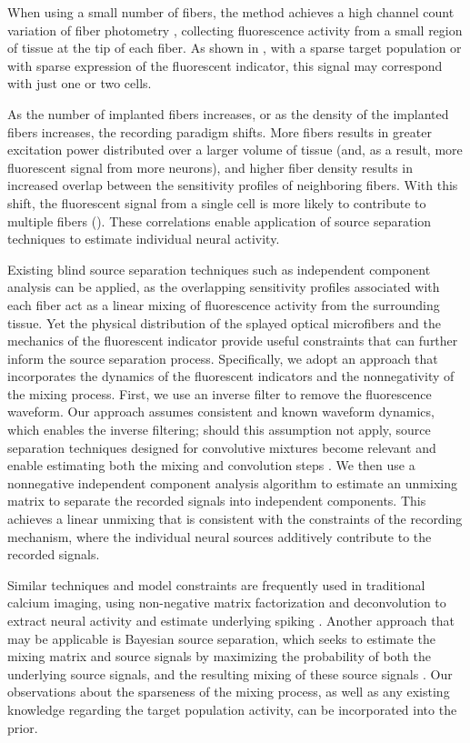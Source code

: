 When using a small number of fibers, the method achieves a high channel count variation of fiber photometry \cite{Guo:2015gu}, collecting fluorescence activity from a small region of tissue at the tip of each fiber. As shown in , with a sparse target population or with sparse expression of the fluorescent indicator, this signal may correspond with just one or two cells.

As the number of implanted fibers increases, or as the density of the implanted fibers increases, the recording paradigm shifts. More fibers results in greater excitation power distributed over a larger volume of tissue (and, as a result, more fluorescent signal from more neurons), and higher fiber density results in increased overlap between the sensitivity profiles of neighboring fibers. With this shift, the fluorescent signal from a single cell is more likely to contribute to multiple fibers (). These correlations enable application of source separation techniques to estimate individual neural activity.

Existing blind source separation techniques such as independent component analysis \cite{Hyvarinen:2000vk} can be applied, as the overlapping sensitivity profiles associated with each fiber act as a linear mixing of fluorescence activity from the surrounding tissue. Yet the physical distribution of the splayed optical microfibers and the mechanics of the fluorescent indicator provide useful constraints that can further inform the source separation process. Specifically, we adopt an approach that incorporates the dynamics of the fluorescent indicators and the nonnegativity of the mixing process. First, we use an inverse filter to remove the fluorescence waveform. Our approach assumes consistent and known waveform dynamics, which enables the inverse filtering; should this assumption not apply, source separation techniques designed for convolutive mixtures become relevant and enable estimating both the mixing and convolution steps \cite{Mitianoudis:2003dw,Ozerov:2010jf}.  We then use a nonnegative independent component analysis algorithm to estimate an unmixing matrix to separate the recorded signals into independent components.  This achieves a linear unmixing that is consistent with the constraints of the recording mechanism, where the individual neural sources additively contribute to the recorded signals. 


Similar techniques and model constraints are frequently used in traditional calcium imaging, using non-negative matrix factorization and deconvolution to extract neural activity and estimate underlying spiking \cite{Pnevmatikakis:2016gr}. Another approach that may be applicable is Bayesian source separation, which seeks to estimate the mixing matrix and source signals by maximizing the probability of both the underlying source signals, and the resulting mixing of these source signals \cite{Knuth:2002vo}. Our observations about the sparseness of the mixing process, as well as any existing knowledge regarding the target population activity, can be incorporated into the prior.

